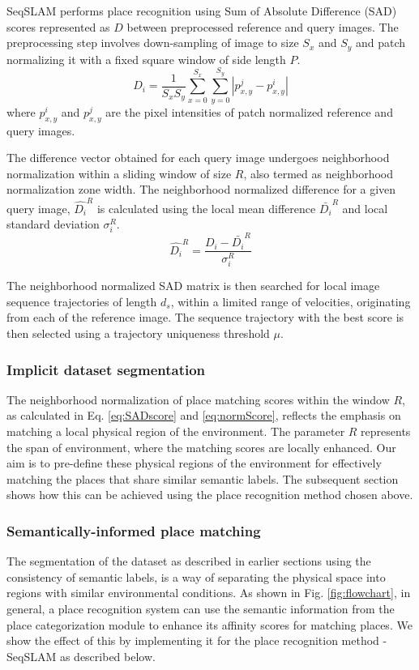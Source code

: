 \documentclass[letterpaper, 10 pt, conference]{ieeeconf}  %
\begin{document}
SeqSLAM performs place recognition using Sum of Absolute Difference (SAD) scores represented as $D$ between preprocessed reference and query images. The preprocessing step involves down-sampling of image to size $S_x$ and $S_y$ and patch normalizing it with a fixed square window of side length $P$.
\begin{equation}
 D_i = \frac{1}{S_xS_y} \sum\limits_{x=0}^{S_x}\sum\limits_{y=0}^{S_y}|p_{x,y}^j-p_{x,y}^i|
 \label{eq:SADscore}
\end{equation}
where $p_{x,y}^i$ and $p_{x,y}^j$ are the pixel intensities of patch normalized reference and query images.

The difference vector obtained for each query image undergoes neighborhood normalization within a sliding window of size $R$, also termed as neighborhood normalization zone width. The neighborhood normalized difference for a given query image, $\hat{D_i}^R$ is calculated using the local mean difference $\bar{D_i}^R$ and local standard deviation $\sigma_i^R$.
\begin{equation}
 \hat{D_i}^R = \frac{D_i-\bar{D_i}^R}{\sigma_i^R}
 \label{eq:normScore}
\end{equation}

The neighborhood normalized SAD matrix is then searched for local image sequence trajectories of length $d_s$, within a limited range of velocities, originating from each of the reference image. The sequence trajectory with the best score is then selected using a trajectory uniqueness threshold $\mu$.

\subsubsection{Implicit dataset segmentation}
The neighborhood normalization of place matching scores within the window $R$, as calculated in Eq. \ref{eq:SADscore} and \ref{eq:normScore}, reflects the emphasis on matching a local physical region of the environment. The parameter $R$ represents the span of environment, where the matching scores are locally enhanced. Our aim is to pre-define these physical regions of the environment for effectively matching the places that share similar semantic labels. The subsequent section shows how this can be achieved using the place recognition method chosen above.

\subsubsection{Semantically-informed place matching}
The segmentation of the dataset as described in earlier sections using the consistency of semantic labels, is a way of separating the physical space into regions with similar environmental conditions. As shown in Fig. \ref{fig:flowchart}, in general, a place recognition system can use the semantic information from the place categorization module to enhance its affinity scores for matching places. We show the effect of this by implementing it for the place recognition method - SeqSLAM as described below.
\end{document}

